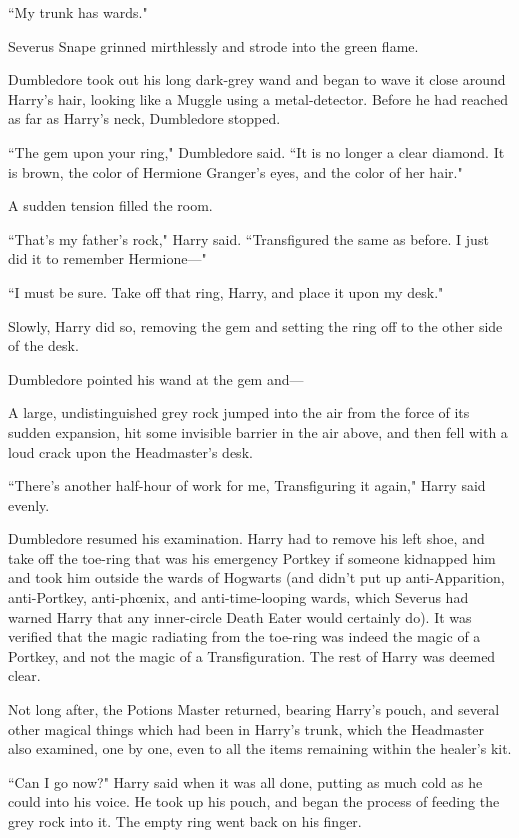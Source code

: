 ``My trunk has wards."

Severus Snape grinned mirthlessly and strode into the green flame.

Dumbledore took out his long dark-grey wand and began to wave it close around Harry's hair, looking like a Muggle using a metal-detector. Before he had reached as far as Harry's neck, Dumbledore stopped.

``The gem upon your ring," Dumbledore said. ``It is no longer a clear diamond. It is brown, the color of Hermione Granger's eyes, and the color of her hair."

A sudden tension filled the room.

``That's my father's rock," Harry said. ``Transfigured the same as before. I just did it to remember Hermione—"

``I must be sure. Take off that ring, Harry, and place it upon my desk."

Slowly, Harry did so, removing the gem and setting the ring off to the other side of the desk.

Dumbledore pointed his wand at the gem and—

A large, undistinguished grey rock jumped into the air from the force of its sudden expansion, hit some invisible barrier in the air above, and then fell with a loud crack upon the Headmaster's desk.

``There's another half-hour of work for me, Transfiguring it again," Harry said evenly.

Dumbledore resumed his examination. Harry had to remove his left shoe, and take off the toe-ring that was his emergency Portkey if someone kidnapped him and took him outside the wards of Hogwarts (and didn't put up anti-Apparition, anti-Portkey, anti-phœnix, and anti-time-looping wards, which Severus had warned Harry that any inner-circle Death Eater would certainly do). It was verified that the magic radiating from the toe-ring was indeed the magic of a Portkey, and not the magic of a Transfiguration. The rest of Harry was deemed clear.

Not long after, the Potions Master returned, bearing Harry's pouch, and several other magical things which had been in Harry's trunk, which the Headmaster also examined, one by one, even to all the items remaining within the healer's kit.

``Can I go now?" Harry said when it was all done, putting as much cold as he could into his voice. He took up his pouch, and began the process of feeding the grey rock into it. The empty ring went back on his finger.

